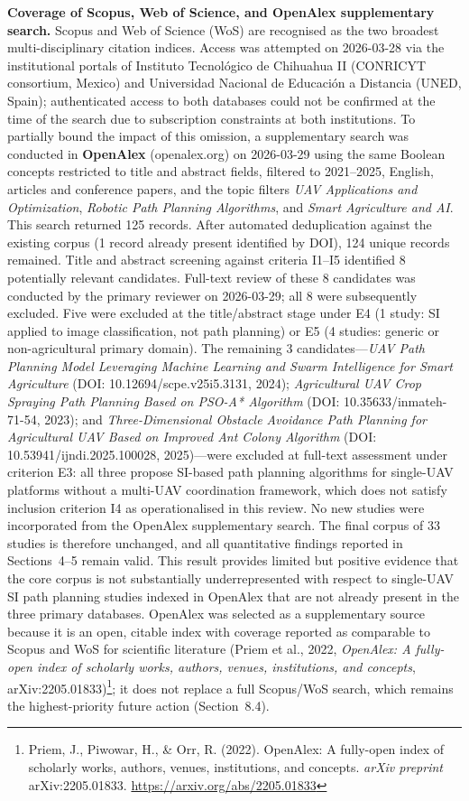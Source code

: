 \documentclass[review,3p,times]{elsarticle}
\begin{document}
\textbf{Coverage of Scopus, Web of Science, and OpenAlex supplementary search.} Scopus and Web of Science (WoS) are recognised as the two broadest multi-disciplinary citation indices. Access was attempted on 2026-03-28 via the institutional portals of Instituto Tecnológico de Chihuahua II (CONRICYT consortium, Mexico) and Universidad Nacional de Educación a Distancia (UNED, Spain); authenticated access to both databases could not be confirmed at the time of the search due to subscription constraints at both institutions. To partially bound the impact of this omission, a supplementary search was conducted in \textbf{OpenAlex} (openalex.org) on 2026-03-29 using the same Boolean concepts restricted to title and abstract fields, filtered to 2021--2025, English, articles and conference papers, and the topic filters \textit{UAV Applications and Optimization}, \textit{Robotic Path Planning Algorithms}, and \textit{Smart Agriculture and AI}. This search returned 125 records. After automated deduplication against the existing corpus (1 record already present identified by DOI), 124 unique records remained. Title and abstract screening against criteria I1--I5 identified 8 potentially relevant candidates. Full-text review of these 8 candidates was conducted by the primary reviewer on 2026-03-29; all 8 were subsequently excluded. Five were excluded at the title/abstract stage under E4 (1 study: SI applied to image classification, not path planning) or E5 (4 studies: generic or non-agricultural primary domain). The remaining 3 candidates---\textit{UAV Path Planning Model Leveraging Machine Learning and Swarm Intelligence for Smart Agriculture} (DOI: 10.12694/scpe.v25i5.3131, 2024); \textit{Agricultural UAV Crop Spraying Path Planning Based on PSO-A* Algorithm} (DOI: 10.35633/inmateh-71-54, 2023); and \textit{Three-Dimensional Obstacle Avoidance Path Planning for Agricultural UAV Based on Improved Ant Colony Algorithm} (DOI: 10.53941/ijndi.2025.100028, 2025)---were excluded at full-text assessment under criterion E3: all three propose SI-based path planning algorithms for single-UAV platforms without a multi-UAV coordination framework, which does not satisfy inclusion criterion I4 as operationalised in this review. No new studies were incorporated from the OpenAlex supplementary search. The final corpus of 33 studies is therefore unchanged, and all quantitative findings reported in Sections~4--5 remain valid. This result provides limited but positive evidence that the core corpus is not substantially underrepresented with respect to single-UAV SI path planning studies indexed in OpenAlex that are not already present in the three primary databases. OpenAlex was selected as a supplementary source because it is an open, citable index with coverage reported as comparable to Scopus and WoS for scientific literature (Priem et al., 2022, \textit{OpenAlex: A fully-open index of scholarly works, authors, venues, institutions, and concepts}, arXiv:2205.01833)\footnote{Priem, J., Piwowar, H., \& Orr, R. (2022). OpenAlex: A fully-open index of scholarly works, authors, venues, institutions, and concepts. \textit{arXiv preprint} arXiv:2205.01833. \url{https://arxiv.org/abs/2205.01833}}; it does not replace a full Scopus/WoS search, which remains the highest-priority future action (Section~8.4).
\end{document}
